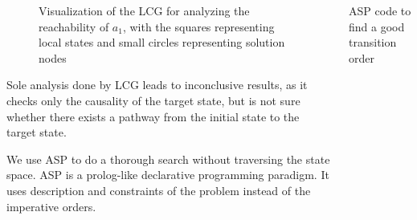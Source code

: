 \documentclass[final]{beamer}
\begin{document}
\begin{frame}[t]{}
\begin{columns}[t]
\begin{column}{.45\linewidth}
\begin{figure}
    \centering
    
    \caption{Visualization of the LCG for analyzing the reachability of $a_1$, with the squares representing local states and small circles representing solution nodes}
\end{figure}
Sole analysis done by LCG leads to inconclusive results, as it checks only the causality of the target state, but is not sure whether there exists a pathway from the initial state to the target state.

We use ASP to do a thorough search without traversing the state space. 
ASP is a prolog-like declarative programming paradigm.
It uses description and constraints of the problem instead of the imperative orders.
\end{column}

\begin{column}{.50\linewidth}


\begin{block}{ASP code to find a good transition order}

\end{block}

\usebox{\myLst} %


\end{column}
\end{columns}
\end{frame}
\end{document}
